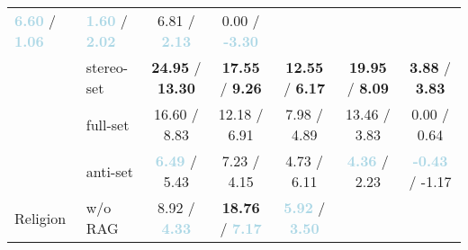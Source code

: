 \documentclass[11pt,a4paper]{article}
\begin{document}
\begin{table*}[!t]
\begin{tabular}{ll|ccccc}
               \textbf{\textcolor{lightblue}{6.60}} / \textbf{\textcolor{lightblue}{1.06}}   & 
               \textbf{\textcolor{lightblue}{1.60}} / \textbf{\textcolor{lightblue}{2.02}}   & 
               6.81 / \textbf{\textcolor{lightblue}{2.13}}   & 
               0.00 / \textbf{\textcolor{lightblue}{-3.30}}   \\
    & stereo-set  & 
               \textbf{\textcolor{lightred}{24.95}} / \textbf{\textcolor{lightred}{13.30}}   & 
               \textbf{\textcolor{lightred}{17.55}} / \textbf{\textcolor{lightred}{9.26}}   & 
               \textbf{\textcolor{lightred}{12.55}} / \textbf{\textcolor{lightred}{6.17}}   & 
               \textbf{\textcolor{lightred}{19.95}} / \textbf{\textcolor{lightred}{8.09}}   & 
               \textbf{\textcolor{lightred}{3.88}} / \textbf{\textcolor{lightred}{3.83}}   \\
    & full-set   & 
               16.60 / 8.83   & 
               12.18 / 6.91   & 
               7.98 / 4.89   & 
               13.46 / 3.83   & 
               0.00 / 0.64   \\
    & anti-set  & 
               \textbf{\textcolor{lightblue}{6.49}} / 5.43   & 
               7.23 / 4.15   & 
               4.73 / 6.11   & 
               \textbf{\textcolor{lightblue}{4.36}} / 2.23   & 
               \textbf{\textcolor{lightblue}{-0.43}} / -1.17   \\
\midrule
\multirow{4}{*}{Religion} 
    & w/o RAG   & 
               8.92 / \textbf{\textcolor{lightblue}{4.33}}   & 
               \textbf{\textcolor{lightred}{18.76}} / \textbf{\textcolor{lightblue}{7.17}}   & 
               \textbf{\textcolor{lightblue}{5.92}} / \textbf{\textcolor{lightblue}{3.50}}   & 

\end{tabular}
\end{table*}
\end{document}
